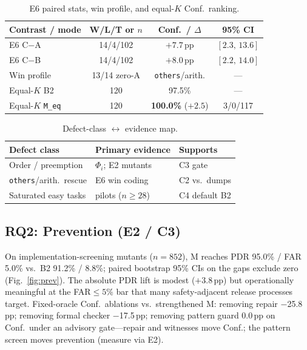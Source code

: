 \documentclass[10pt,conference]{IEEEtran}
\begin{document}
\begin{table}[t]
\centering
\caption{E6 paired stats, win profile, and equal-$K$ Conf.\ ranking.}
\label{tab:e6}
\footnotesize
\begin{tabular}{lccc}
\toprule
Contrast / mode & W/L/T or $n$ & Conf.\ / $\Delta$ & 95\% CI \\
\midrule
E6 C$-$A & 14/4/102 & $+7.7$\,pp & $[2.3,\,13.6]$ \\
E6 C$-$B & 14/4/102 & $+8.0$\,pp & $[2.2,\,14.0]$ \\
Win profile & 13/14 zero-A & \texttt{others}/arith. & --- \\
Equal-$K$ B2 & 120 & 97.5\% & --- \\
Equal-$K$ \texttt{M\_eq} & 120 & \textbf{100.0\%} (${+}2.5$) & 3/0/117 \\
\bottomrule
\end{tabular}
\end{table}

\begin{table}[t]
\centering
\caption{Defect-class $\leftrightarrow$ evidence map.}
\label{tab:defect-map}
\footnotesize
\begin{tabular}{@{}lll@{}}
\toprule
Defect class & Primary evidence & Supports \\
\midrule
Order / preemption & $\Phi_i$; E2 mutants & C3 gate \\
\texttt{others}/arith.\ rescue & E6 win coding & C2 vs.\ dumps \\
Saturated easy tasks & pilots ($n{\ge}28$) & C4 default B2 \\
\bottomrule
\end{tabular}
\end{table}

\subsection{RQ2: Prevention (E2 / C3)}
On implementation-screening mutants ($n{=}852$), M reaches PDR 95.0\% / FAR
5.0\% vs.\ B2 91.2\% / 8.8\%; paired bootstrap 95\% CIs on the gaps exclude
zero (Fig.~\ref{fig:prev}).
The absolute PDR lift is modest (${+}3.8$\,pp) but operationally meaningful at
the FAR${\le}5\%$ bar that many safety-adjacent release processes target.
Fixed-oracle Conf.\ ablations vs.\ strengthened M: removing repair $-$25.8\,pp;
removing formal checker $-$17.5\,pp; removing pattern guard $0.0$\,pp on Conf.\
under an advisory gate---repair and witnesses move Conf.; the pattern screen
moves prevention (measure via E2).
\end{document}
